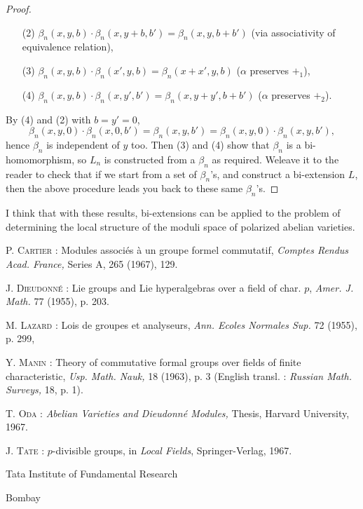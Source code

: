 \begin{proof}
\begin{itemize}
\item[(2)] $\beta_{n}(x,y,b)\cdot \beta_{n}(x,y+b,b')=\beta_{n}(x,y,b+b')$ (via associativity of equivalence relation),

\item[(3)] $\beta_{n}(x,y,b)\cdot \beta_{n}(x',y,b)=\beta_{n}(x+x',y,b)$ ($\alpha$ preserves $+_{1}$),

\item[(4)] $\beta_{n}(x,y,b)\cdot \beta_{n}(x,y',b')=\beta_{n}(x,y+y',b+b')$ ($\alpha$ preserves $+_{2}$).
\end{itemize}
By (4) and (2) with $b=y'=0$,
$$
\beta_{n}(x,y,0)\cdot \beta_{n}(x,0,b')=\beta_{n}(x,y,b')=\beta_{n}(x,y,0)\cdot \beta_{n}(x,y,b'),
$$
hence $\beta_{n}$ is independent of $y$ too. Then (3) and (4) show that $\beta_{n}$ is a bi-homomorphism, so $L_{n}$ is constructed from a $\beta_{n}$ as required. We\pageoriginale leave it to the reader to check that if we start from a set of $\beta_{n}$'s, and construct a bi-extension $L$, then the above procedure leads you back to these same $\beta_{n}$'s.
\end{proof}

I think that with these results, bi-extensions can be applied to the problem of determining the local structure of the moduli space of polarized abelian varieties.

\begin{thebibliography}{99}
 \textsc{P. Cartier :} Modules associ\'es \`a un groupe formel commutatif, {\em Comptes Rendus Acad. France,} Series A, 265 (1967), 129.

 \textsc{J. Dieudonn\'e :} Lie groups and Lie hyperalgebras over a field of char. $p$, {\em Amer. J. Math.} 77 (1955), p. 203.

 \textsc{M. Lazard :} Lois de groupes et analyseurs, {\em Ann. Ecoles Normales Sup.} 72 (1955), p. 299, 

 \textsc{Y. Manin :} Theory of commutative formal groups over fields of finite characteristic, {\em Usp. Math. Nauk,} 18 (1963), p. 3 (English transl. : {\em Russian Math. Surveys,} 18, p. 1).

 \textsc{T. Oda :} {\em Abelian Varieties and Dieudonn\'e Modules,} Thesis, Harvard University, 1967.

 \textsc{J. Tate :} $p$-divisible groups, in {\em Local Fields}, Springer-Verlag, 1967.

\end{thebibliography}

\bigskip

\noindent
{\small Tata Institute of Fundamental Research}

\noindent
{\small Bombay}
